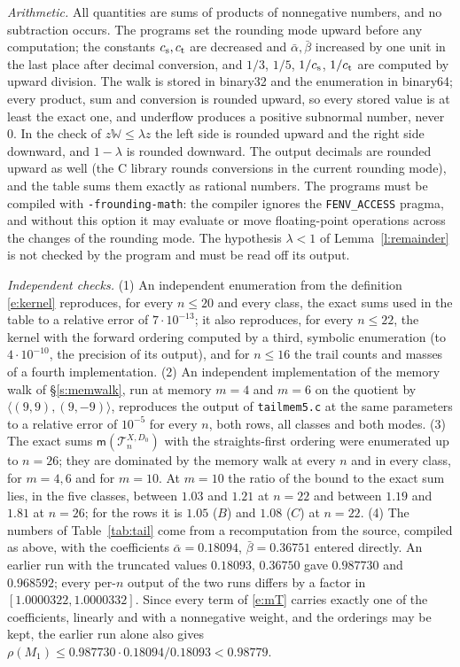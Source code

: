 \emph{Arithmetic.} All quantities are sums of products of nonnegative numbers, and no subtraction occurs. The programs set the rounding mode upward before any computation; the constants $c_{\mathrm{s}}, c_{\mathrm{t}}$ are decreased and $\bar\alpha, \bar\beta$ increased by one unit in the last place after decimal conversion, and $1/3$, $1/5$, $1/c_{\mathrm{s}}$, $1/c_{\mathrm{t}}$ are computed by upward division. The walk is stored in binary32 and the enumeration in binary64; every product, sum and conversion is rounded upward, so every stored value is at least the exact one, and underflow produces a positive subnormal number, never $0$. In the check of $z \mathbb W \le \lambda z$ the left side is rounded upward and the right side downward, and $1 - \lambda$ is rounded downward. The output decimals are rounded upward as well (the C library rounds conversions in the current rounding mode), and the table sums them exactly as rational numbers. The programs must be compiled with \texttt{-frounding-math}: the compiler ignores the \texttt{FENV\_ACCESS} pragma, and without this option it may evaluate or move floating-point operations across the changes of the rounding mode. The hypothesis $\lambda < 1$ of Lemma~\ref{l:remainder} is not checked by the program and must be read off its output.

\emph{Independent checks.} (1) An independent enumeration from the definition \eqref{e:kernel} reproduces, for every $n \le 20$ and every class, the exact sums used in the table to a relative error of $7 \cdot 10^{-13}$; it also reproduces, for every $n \le 22$, the kernel with the forward ordering computed by a third, symbolic enumeration (to $4 \cdot 10^{-10}$, the precision of its output), and for $n \le 16$ the trail counts and masses of a fourth implementation. (2) An independent implementation of the memory walk of \S\ref{s:memwalk}, run at memory $m = 4$ and $m = 6$ on the quotient by $\langle (9, 9), (9, -9) \rangle$, reproduces the output of \texttt{tailmem5.c} at the same parameters to a relative error of $10^{-5}$ for every $n$, both rows, all classes and both modes. (3) The exact sums $\mathsf m(\mathcal T^{X, D_0}_n)$ with the straights-first ordering were enumerated up to $n = 26$; they are dominated by the memory walk at every $n$ and in every class, for $m = 4, 6$ and for $m = 10$. At $m = 10$ the ratio of the bound to the exact sum lies, in the five classes, between $1.03$ and $1.21$ at $n = 22$ and between $1.19$ and $1.81$ at $n = 26$; for the rows it is $1.05$ ($B$) and $1.08$ ($C$) at $n = 22$. (4) The numbers of Table~\ref{tab:tail} come from a recomputation from the source, compiled as above, with the coefficients $\bar\alpha = 0.18094$, $\bar\beta = 0.36751$ entered directly. An earlier run with the truncated values $0.18093$, $0.36750$ gave $0.987730$ and $0.968592$; every per-$n$ output of the two runs differs by a factor in $[1.0000322, 1.0000332]$. Since every term of \eqref{e:mT} carries exactly one of the coefficients, linearly and with a nonnegative weight, and the orderings may be kept, the earlier run alone also gives $\rho(M_1) \le 0.987730 \cdot 0.18094/0.18093 < 0.98779$.

